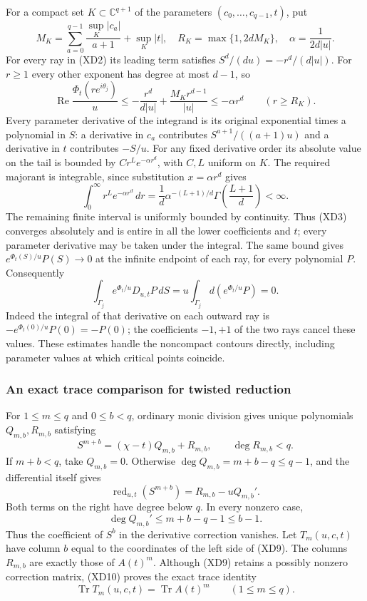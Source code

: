For a compact set $K\subset\mathbb C^{q+1}$ of the parameters
$(c_0,\ldots,c_{q-1},t)$, put
\[
 M_K=\sum_{a=0}^{q-1}\frac{\sup_K|c_a|}{a+1}+\sup_K|t|,
 \quad R_K=\max\{1,2dM_K\},\quad\alpha=\frac1{2d|u|}.
 \tag{XD4}
\]
For every ray in (XD2) its leading term satisfies
$S^d/(du)=-r^d/(d|u|)$. For $r\geq1$ every other exponent
has degree at most $d-1$, so
\[
 \operatorname{Re}\frac{\Phi_t(re^{i\theta_j})}{u}
 \leq-\frac{r^d}{d|u|}+\frac{M_Kr^{d-1}}{|u|}
 \leq-\alpha r^d\qquad(r\geq R_K).
 \tag{XD5}
\]
Every parameter derivative of the integrand is its original exponential
times a polynomial in $S$: a derivative in $c_a$ contributes
$S^{a+1}/((a+1)u)$ and a derivative in $t$ contributes $-S/u$.
For any fixed derivative order its absolute value on the tail is
bounded by $Cr^L e^{-\alpha r^d}$, with $C,L$ uniform on $K$.
The required majorant is integrable, since substitution
$x=\alpha r^d$ gives
\[
 \int_0^\infty r^L e^{-\alpha r^d}\,dr
 =\frac1d\alpha^{-(L+1)/d}
    \Gamma\!\left(\frac{L+1}{d}\right)<\infty.
 \tag{XD6}
\]
The remaining finite interval is uniformly bounded by continuity.
Thus (XD3) converges absolutely and is entire in all the lower
coefficients and $t$; every parameter derivative may be taken under
the integral. The same bound gives
$e^{\Phi_t(S)/u}P(S)\longrightarrow0$ at the infinite endpoint
of each ray, for every polynomial $P$. Consequently
\[
 \int_{\Gamma_j}e^{\Phi_t/u}D_{u,t}P\,dS
 =u\int_{\Gamma_j}d(e^{\Phi_t/u}P)=0.
 \tag{XD7}
\]
Indeed the integral of that derivative on each outward ray is
$-e^{\Phi_t(0)/u}P(0)=-P(0)$; the coefficients $-1,+1$ of
the two rays cancel these values. These estimates handle the
noncompact contours directly, including parameter values at which
critical points coincide.

\subsubsection{An exact trace comparison for twisted reduction}

For $1\leq m\leq q$ and $0\leq b<q$, ordinary monic division gives
unique polynomials $Q_{m,b},R_{m,b}$ satisfying
\[
 S^{m+b}=(\chi-t)Q_{m,b}+R_{m,b},\qquad
 \deg R_{m,b}<q.
 \tag{XD8}
\]
If $m+b<q$, take $Q_{m,b}=0$. Otherwise
$\deg Q_{m,b}=m+b-q\leq q-1$, and the differential itself gives
\[
 \operatorname{red}_{u,t}(S^{m+b})
   =R_{m,b}-uQ_{m,b}'.
 \tag{XD9}
\]
Both terms on the right have degree below $q$. In every nonzero
case,
\[
 \deg Q_{m,b}'\leq m+b-q-1\leq b-1.
 \tag{XD10}
\]
Thus the coefficient of $S^b$ in the derivative correction vanishes.
Let $T_m(u,c,t)$ have column $b$ equal to the coordinates of the
left side of (XD9). The columns $R_{m,b}$ are exactly those of
$A(t)^m$. Although (XD9) retains a possibly nonzero correction
matrix, (XD10) proves the exact trace identity
\[
 \operatorname{Tr}T_m(u,c,t)=\operatorname{Tr}A(t)^m
       \qquad(1\leq m\leq q).
 \tag{XD11}
\]

